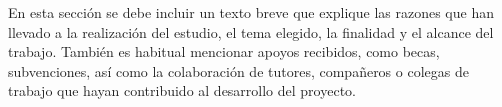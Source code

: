 


En esta sección se debe incluir un texto breve que explique las razones que han llevado a la realización del estudio, el tema elegido, la finalidad y el alcance del trabajo. También es habitual mencionar apoyos recibidos, como becas, subvenciones, así como la colaboración de tutores, compañeros o colegas de trabajo que hayan contribuido al desarrollo del proyecto.
